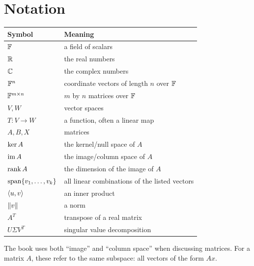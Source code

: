 \chapter*{Notation}

\begin{center}
\begin{tabular}{ll}
\toprule
Symbol & Meaning \\
\midrule
$\mathbb{F}$ & a field of scalars \\
$\mathbb{R}$ & the real numbers \\
$\mathbb{C}$ & the complex numbers \\
$\mathbb{F}^n$ & coordinate vectors of length $n$ over $\mathbb{F}$ \\
$\mathbb{F}^{m\times n}$ & $m$ by $n$ matrices over $\mathbb{F}$ \\
$V,W$ & vector spaces \\
$T:V\to W$ & a function, often a linear map \\
$A,B,X$ & matrices \\
$\operatorname{ker} A$ & the kernel/null space of $A$ \\
$\operatorname{im} A$ & the image/column space of $A$ \\
$\operatorname{rank} A$ & the dimension of the image of $A$ \\
$\operatorname{span}\{v_1,\ldots,v_k\}$ & all linear combinations of the listed vectors \\
$\left\langle u,v \right\rangle$ & an inner product \\
$\left\lVert v \right\rVert$ & a norm \\
$A^T$ & transpose of a real matrix \\
$U\Sigma V^T$ & singular value decomposition \\
\bottomrule
\end{tabular}
\end{center}

The book uses both ``image'' and ``column space'' when discussing matrices.
For a matrix $A$, these refer to the same subspace: all vectors of the form
$Ax$.
